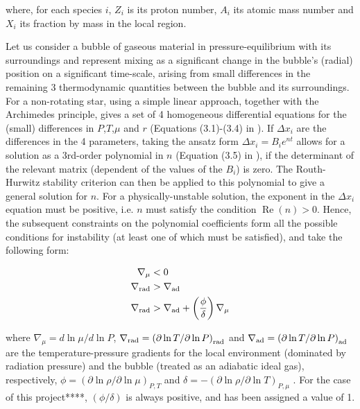 \documentclass[usenatbib]{mnras}
\begin{document}
where, for each species $i$, $Z_{i}$ is its proton number, $A_{i}$ its atomic mass number and $X_{i}$ its fraction by mass in the local region.

Let us consider a bubble of gaseous material in pressure-equilibrium with its surroundings and represent mixing as a significant change in the bubble's (radial) position on a significant time-scale, arising from small differences in the remaining 3 thermodynamic quantities between the bubble and its surroundings. For a non-rotating star, using a simple linear approach, together with the Archimedes principle, gives a set of 4 homogeneous differential equations for the (small) differences in $P$,$T$,$\mu$ and $r$ (Equations (3.1)-(3.4) in \citet{2017RSOS....470192S}). If $\Delta x_{i}$ are the differences in the 4 parameters, taking the ansatz form $\Delta x_{i} = B_{i} e^{nt}$ allows for a solution as a 3rd-order polynomial in $n$ (Equation (3.5) in \citet{2017RSOS....470192S}), if the determinant of the relevant matrix (dependent of the values of the $B_{i}$) is zero. The Routh-Hurwitz stability criterion can then be applied to this polynomial to give a general solution for $n$. For a physically-unstable solution, the exponent in the $\Delta x_{i}$ equation must be positive, i.e. $n$ must satisfy the condition $\operatorname{Re}(n) > 0$. Hence, the subsequent constraints on the polynomial coefficients form all the possible conditions for instability (at least one of which must be satisfied), and take the following form:

\begin{align}
\nabla _{\mu} &< 0 \label{mu_inv_ineq} \\
\nabla _{\textnormal{rad}} &> \nabla _{\textnormal{ad}} \label{schwarz_ineq} \\
\nabla _{\textnormal{rad}} &> \nabla _{\textnormal{ad}} + \left( \frac{\phi}{\delta} \right) \nabla _{\mu} \label{ledoux_ineq}
\end{align}

where $\nabla _{\mu} = d\ln\mu / d\ln P$, $\nabla _{\textnormal{rad}} = \left(\partial\ln T / \partial\ln P \right)_{\textnormal{rad}}$ and $\nabla _{\textnormal{ad}} = \left(\partial\ln T / \partial\ln P \right)_{\textnormal{ad}}$ are the temperature-pressure gradients for the local environment (dominated by radiation pressure) and the bubble (treated as an adiabatic ideal gas), respectively, $\phi = \left( \partial \ln\rho / \partial \ln\mu \right)_{P,T}$ and $\delta = -\left( \partial \ln\rho / \partial \ln T \right)_{P,\mu}$  \citep{1980A&A....91..175K}. For the case of this project****, $(\phi/\delta)$ is always positive, and has been assigned a value of 1.
\end{document}
